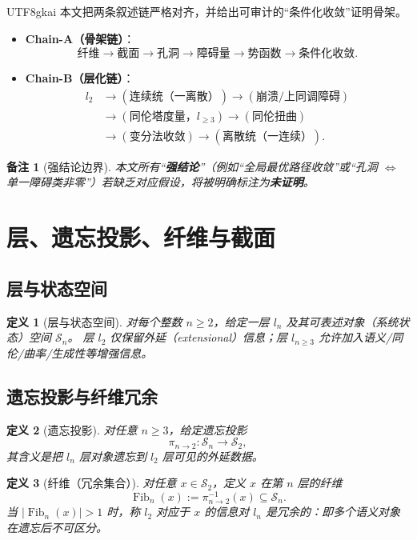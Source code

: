 \documentclass[12pt]{article}
\newtheorem{definition}{定义}[section]
\newtheorem{remark}{备注}[section]
\begin{document}
\begin{CJK*}{UTF8}{gkai}
本文把两条叙述链严格对齐，并给出可审计的“条件化收敛”证明骨架。

\begin{itemize}
\item \textbf{Chain-A（骨架链）}：
\[
\text{纤维}\to\text{截面}\to\text{孔洞}\to\text{障碍量}\to\text{势函数}\to\text{条件化收敛}.
\]
\item \textbf{Chain-B（层化链）}：
\[
\begin{aligned}
l_2
&\to(\text{连续统（一离散）})\to(\text{崩溃/上同调障碍})\\
&\to(\text{同伦塔度量，}l_{\ge3})\to(\text{同伦扭曲})\\
&\to(\text{变分法收敛})\to(\text{离散统（一连续）}).
\end{aligned}
\]
\end{itemize}

\begin{remark}[强结论边界]
本文所有“\textbf{强结论}”（例如“全局最优路径收敛”或“孔洞 $\Leftrightarrow$ 单一障碍类非零”）若缺乏对应假设，将被明确标注为\textbf{未证明}。
\end{remark}

\section{层、遗忘投影、纤维与截面}

\subsection{层与状态空间}

\begin{definition}[层与状态空间]\label{def:layer-space}
对每个整数 $n\ge 2$，给定一层 $l_n$ 及其可表述对象（系统状态）空间 $\mathcal S_n$。
层 $l_2$ 仅保留外延（extensional）信息；层 $l_{n\ge3}$ 允许加入语义/同伦/曲率/生成性等增强信息。
\end{definition}

\subsection{遗忘投影与纤维冗余}

\begin{definition}[遗忘投影]\label{def:forget-map}
对任意 $n\ge3$，给定遗忘投影
\[
\pi_{n\to2}:\mathcal S_n\to\mathcal S_2,
\]
其含义是把 $l_n$ 层对象遗忘到 $l_2$ 层可见的外延数据。
\end{definition}

\begin{definition}[纤维（冗余集合）]\label{def:fiber}
对任意 $x\in\mathcal S_2$，定义 $x$ 在第 $n$ 层的纤维
\[
\operatorname{Fib}_n(x):=\pi_{n\to2}^{-1}(x)\subseteq \mathcal S_n.
\]
当 $|\operatorname{Fib}_n(x)|>1$ 时，称 $l_2$ 对应于 $x$ 的信息对 $l_n$ 是\emph{冗余的}：即多个语义对象在遗忘后不可区分。
\end{definition}


\end{CJK*}
\end{document}
